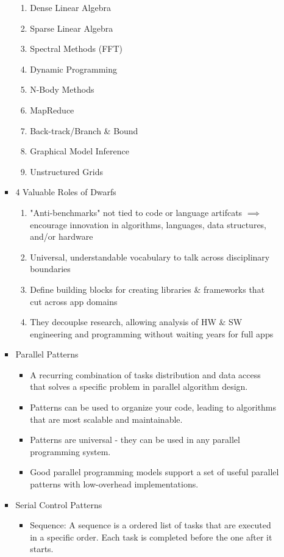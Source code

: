 \documentclass[paper=a4, fontsize=11pt]{scrartcl} %
\numberwithin{equation}{section} %
\numberwithin{figure}{section} %
\numberwithin{table}{section} %
\begin{document}
\begin{itemize}
\begin{itemize}
\begin{itemize}
\begin{enumerate}
        \item Dense Linear Algebra
        \item Sparse Linear Algebra
        \item Spectral Methods (FFT)
        \item Dynamic Programming
        \item N-Body Methods
        \item MapReduce
        \item Back-track/Branch \& Bound
        \item Graphical Model Inference
        \item Unstructured Grids
      \end{enumerate}
      \item 4 Valuable Roles of Dwarfs
      \begin{enumerate}
        \item "Anti-benchmarks" not tied to code or language artifcats $\implies$ encourage innovation in algorithms, languages, data structures, and/or hardware
        \item Universal, understandable vocabulary to talk across disciplinary boundaries
        \item Define building blocks for creating libraries \& frameworks that cut across app domains
        \item They decouplse research, allowing analysis of HW \& SW engineering and programming without waiting years for full apps
      \end{enumerate}
      \item Parallel Patterns
      \begin{itemize}
        \item A recurring combination of tasks distribution and data access that solves a specific problem in parallel algorithm design.
        \item Patterns can be used to organize your code, leading to algorithms that are most scalable and maintainable.
        \item Patterns are universal - they can be used in any parallel programming system.
        \item Good parallel programming models support a set of useful parallel patterns with low-overhead implementations.
      \end{itemize}
      \item Serial Control Patterns
      \begin{itemize}
        \item Sequence: A sequence is a ordered list of tasks that are executed in a specific order. Each task is completed before the one after it starts.

\end{itemize}
\end{itemize}
\end{itemize}
\end{itemize}
\end{document}
